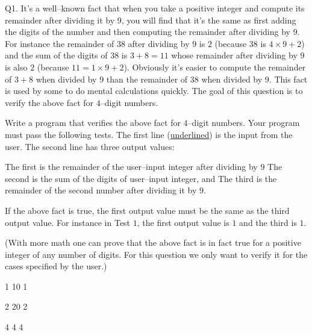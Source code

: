 Q1.
It's a well--known fact that when you take a positive integer and compute its remainder after dividing it by $9$, you will find that it's the same as first adding the digits of the number and then computing the remainder after dividing by $9$. For instance the remainder of $38$ after dividing by $9$ is $2$ (because $38$ is $4 \times 9 + 2$) and the sum of the digits of $38$ is $3 + 8 = 11$ whose remainder after dividing by $9$ is also $2$ (because $11 = 1 \times 9 + 2$). Obviously it's easier to compute the remainder of $3 + 8$ when divided by $9$ than the remainder of $38$ when divided by $9$. This fact is used by some to do mental calculations quickly. The goal of this question is to verify the above fact for $4$--digit numbers.

Write a program that verifies the above fact for $4$--digit numbers. Your program must pass the following tests. The first line (\underline{underlined}) is the input from the user. The second line has three output values: 
\begin{tightlist}
\li The first is the remainder of the user--input integer after dividing by $9$
\li The second is the sum of the digits of user--input integer, and 
\li The third is the remainder of the second number after dividing it by $9$. 
\end{tightlist}
If the above fact is true, the first output value must be the same as the third output value. For instance in Test $1$, the first output value is $1$ and the third is $1$.

(With more math one can prove that the above fact is in fact true for a positive integer of any number of digits. For this question we only want to verify it for the cases specified by the user.)

\resett
\nextt
\begin{console}[commandchars=\\\{\}]
1 10 1
\end{console}

\nextt
\begin{console}[commandchars=\\\{\}]
2 20 2
\end{console}

\nextt
\begin{console}[commandchars=\\\{\}]
4 4 4
\end{console}
